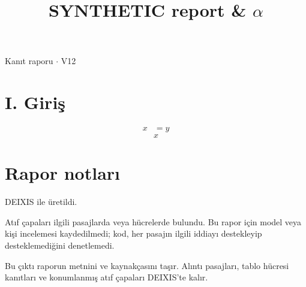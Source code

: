 \documentclass[journal]{IEEEtran}
\begin{document}
\renewcommand{\abstractname}{Özet}
\renewcommand{\IEEEkeywordsname}{Dizin Terimleri}
\renewcommand{\refname}{Kaynaklar}

\title{SYNTHETIC report \& \ensuremath{\alpha}}

\maketitle

\noindent Kanıt raporu \ensuremath{\cdot} V12

\section*{I. Giriş}

\begin{align}x&=y\end{align}
\cite{Synth26}
\begin{equation}
\label{eq:EQ1}
x
\end{equation}
\cite{Synth26}

\section*{Rapor notları}

DEIXIS ile üretildi.

Atıf çapaları ilgili pasajlarda veya hücrelerde bulundu. Bu rapor için model veya kişi incelemesi kaydedilmedi; kod, her pasajın ilgili iddiayı destekleyip desteklemediğini denetlemedi.

Bu çıktı raporun metnini ve kaynakçasını taşır. Alıntı pasajları, tablo hücresi kanıtları ve konumlanmış atıf çapaları DEIXIS'te kalır.




\end{document}
